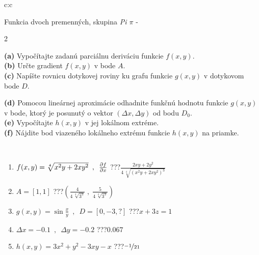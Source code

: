 \documentclass[10pt]{report}
\begin{document}
\begin{tabular}{c:c}
\begin{minipage}[c][104.5mm][t]{0.5\linewidth}
\begin{center}
\vspace{7mm}
{\huge \LARGE Funkcia dvoch premenných, skupina \textit{Pi $\pi$} -}\\[5mm]
\begin{minipage}{0.95\linewidth}
\begin{center}
{\small \begin{multicols}{2} \raggedright
\textbf{(a)} Vypočítajte zadanú parciálnu deriváciu funkcie \(f(x,y)\). \\[1mm]
\textbf{(b)} Určte gradient \(f(x,y)\) v bode \(A\). \\[1mm]
\textbf{(c)} Napíšte rovnicu dotykovej roviny ku grafu funkcie \(g(x,y)\) v dotykovom bode \(D\). \par \columnbreak
\textbf{(d)} Pomocou lineárnej aproximácie odhadnite funkčnú hodnotu funkcie \(g(x,y)\) v bode, ktorý je posunutý o vektor \((\Delta x, \Delta y)\) od bodu \(D_0\). \\[1mm]
\textbf{(e)} Vypočítajte \(h(x,y)\) v jej lokálnom extréme. \\[1mm]
\textbf{(f)} Nájdite bod viazeného lokálneho extrému funkcie \(h(x,y)\) na priamke. \\[1mm]
\end{multicols}
}
\end{center}
\end{minipage}
\\[4mm]
\begin{minipage}{0.79\linewidth}
\begin{center}
\begin{varwidth}{\linewidth}
\begin{enumerate}
\normalsizerr
\item $f(x,y) = \sqrt[4]{x^2y + 2xy^2}\enspace , \enspace \pdv{f}{x}$\quad \dotfill\; ???\;\dotfill \quad $\frac{2xy+2y^2}{4\,\sqrt[4]{(x^2y+2xy^2)^{3}}}$
\item $A = [1, 1]$\quad \dotfill\; ???\;\dotfill \quad $\left( \frac{4}{4\,\sqrt[4]{3^3}} \;,\; \frac{5}{4\,\sqrt[4]{3^3}} \right)$
\item $g(x,y) = \sin\frac{x}{y} \enspace , \enspace D = [0, -3, ?]$\quad \dotfill\; ???\;\dotfill \quad $x+3z=1$
\item $\Delta x = {-0.1} \enspace,\enspace \Delta y = {-0.2}$\quad \dotfill\; ???\;\dotfill \quad $0.067$
\item $h(x,y) = 3x^2+y^2-3xy-x$\quad \dotfill\; ???\;\dotfill \quad $\nicefrac{-1}{21}$

\end{enumerate}
\end{varwidth}
\end{center}
\end{minipage}
\end{center}
\end{minipage}
\end{tabular}
\end{document}

